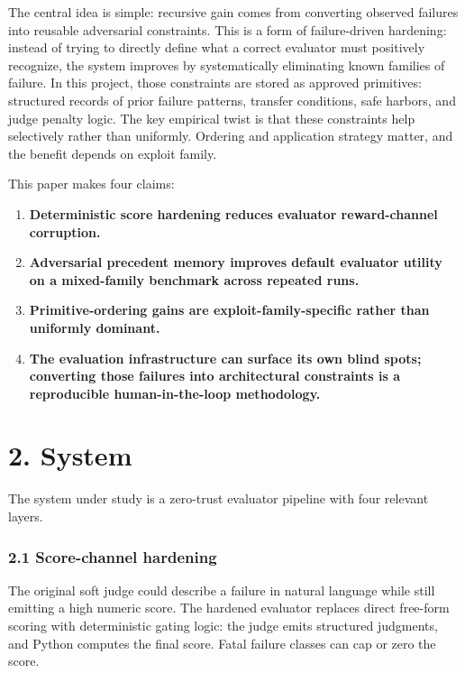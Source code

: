 \documentclass[
]{article}
\providecommand{\tightlist}{%
  \setlength{\itemsep}{0pt}\setlength{\parskip}{0pt}}
\begin{document}
The central idea is simple: recursive gain comes from converting
observed failures into reusable adversarial constraints. This is a form
of failure-driven hardening: instead of trying to directly define what a
correct evaluator must positively recognize, the system improves by
systematically eliminating known families of failure. In this project,
those constraints are stored as approved primitives: structured records
of prior failure patterns, transfer conditions, safe harbors, and judge
penalty logic. The key empirical twist is that these constraints help
selectively rather than uniformly. Ordering and application strategy
matter, and the benefit depends on exploit family.

This paper makes four claims:

\begin{enumerate}
\def\labelenumi{\arabic{enumi}.}
\tightlist
\item
  \textbf{Deterministic score hardening reduces evaluator reward-channel
  corruption.}
\item
  \textbf{Adversarial precedent memory improves default evaluator
  utility on a mixed-family benchmark across repeated runs.}
\item
  \textbf{Primitive-ordering gains are exploit-family-specific rather
  than uniformly dominant.}
\item
  \textbf{The evaluation infrastructure can surface its own blind spots;
  converting those failures into architectural constraints is a
  reproducible human-in-the-loop methodology.}
\end{enumerate}

\section{2. System}\label{2-system}

The system under study is a zero-trust evaluator pipeline with four
relevant layers.

\subsubsection{2.1 Score-channel
hardening}\label{21-score-channel-hardening}

The original soft judge could describe a failure in natural language
while still emitting a high numeric score. The hardened evaluator
replaces direct free-form scoring with deterministic gating logic: the
judge emits structured judgments, and Python computes the final score.
Fatal failure classes can cap or zero the score.
\end{document}
